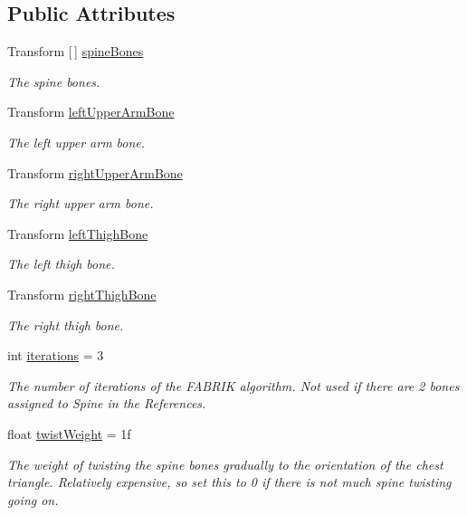 \subsection*{Public Attributes}
\begin{DoxyCompactItemize}
\item 
Transform \mbox{[}$\,$\mbox{]} \mbox{\hyperlink{class_root_motion_1_1_final_i_k_1_1_i_k_mapping_spine_ab118efa5b19ede201002f31e4040c41e}{spine\+Bones}}
\begin{DoxyCompactList}\small\item\em The spine bones. \end{DoxyCompactList}\item 
Transform \mbox{\hyperlink{class_root_motion_1_1_final_i_k_1_1_i_k_mapping_spine_a474883eb91e524d854fde7a4786ec45d}{left\+Upper\+Arm\+Bone}}
\begin{DoxyCompactList}\small\item\em The left upper arm bone. \end{DoxyCompactList}\item 
Transform \mbox{\hyperlink{class_root_motion_1_1_final_i_k_1_1_i_k_mapping_spine_aa3fa6d5057535615fb2192b6b15dd126}{right\+Upper\+Arm\+Bone}}
\begin{DoxyCompactList}\small\item\em The right upper arm bone. \end{DoxyCompactList}\item 
Transform \mbox{\hyperlink{class_root_motion_1_1_final_i_k_1_1_i_k_mapping_spine_a3ece51db8feeabba8019c7bd7422bdfc}{left\+Thigh\+Bone}}
\begin{DoxyCompactList}\small\item\em The left thigh bone. \end{DoxyCompactList}\item 
Transform \mbox{\hyperlink{class_root_motion_1_1_final_i_k_1_1_i_k_mapping_spine_a83f31f3639f4c4c5144f0a45a7341b64}{right\+Thigh\+Bone}}
\begin{DoxyCompactList}\small\item\em The right thigh bone. \end{DoxyCompactList}\item 
int \mbox{\hyperlink{class_root_motion_1_1_final_i_k_1_1_i_k_mapping_spine_aa2c6102a21543d17604dcc8162785d47}{iterations}} = 3
\begin{DoxyCompactList}\small\item\em The number of iterations of the F\+A\+B\+R\+IK algorithm. Not used if there are 2 bones assigned to Spine in the References. \end{DoxyCompactList}\item 
float \mbox{\hyperlink{class_root_motion_1_1_final_i_k_1_1_i_k_mapping_spine_a70f6355224d99c8745a9fd7ab6a87cb8}{twist\+Weight}} = 1f
\begin{DoxyCompactList}\small\item\em The weight of twisting the spine bones gradually to the orientation of the chest triangle. Relatively expensive, so set this to 0 if there is not much spine twisting going on. \end{DoxyCompactList}\end{DoxyCompactItemize}
